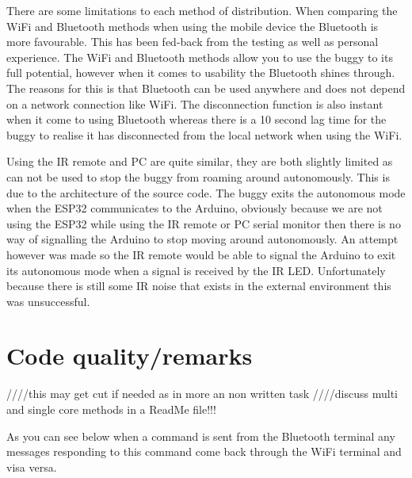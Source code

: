 \documentclass[8pt, a4paper]{article}
\begin{document}
There are some limitations to each method of distribution. When comparing the WiFi and Bluetooth methods when using the mobile device the Bluetooth is more favourable. This has been fed-back from the testing as well as personal experience. The WiFi and Bluetooth methods allow you to use the buggy to its full potential, however when it comes to usability the Bluetooth shines through. The reasons for this is that Bluetooth can be used anywhere and does not depend on a network connection like WiFi. The disconnection function is also instant when it come to using Bluetooth whereas there is a 10 second lag time for the buggy to realise it has disconnected from the local network when using the WiFi. 

Using the IR remote and PC are quite similar, they are both slightly limited as can not be used to stop the buggy from roaming around autonomously. This is due to the architecture of the source code. The buggy exits the autonomous mode when the ESP32 communicates to the Arduino, obviously because we are not using the ESP32 while using the IR remote or PC serial monitor then there is no way of signalling the Arduino to stop moving around autonomously. An attempt however was made so the IR remote would be able to signal the Arduino to exit its autonomous mode when a signal is received by the IR LED. Unfortunately because there is still some IR noise that exists in the external environment this was unsuccessful.

 

	

\section{Code quality/remarks} ////this may get cut if needed as in more an non written task
////discuss multi and single core methods in a ReadMe file!!!


As you can see below when a command is sent from the Bluetooth terminal any messages responding to this command come back through the WiFi terminal and visa versa. 
\end{document}
